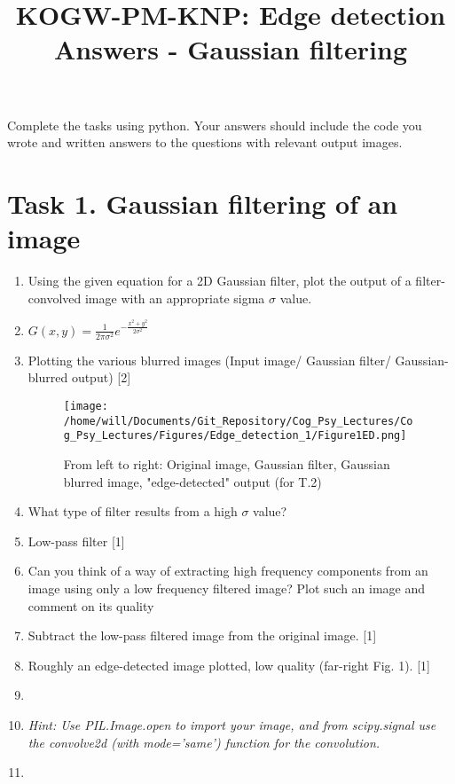\documentclass[12pt,english]{scrartcl}
\title{KOGW-PM-KNP: Edge detection Answers - Gaussian filtering}
\begin{document}
\maketitle

Complete the tasks using python. Your answers should include the code you wrote and written answers to the questions with relevant output images.

\section*{Task 1. Gaussian filtering of an image}

\begin{enumerate}
 \item Using the given equation for a 2D Gaussian filter, plot the output of a filter-convolved image with an appropriate sigma $\sigma$ value.
 \item[]
 \centering
 $G(x,y) = \frac{1}{2\pi\sigma^2} e^{-\frac{x^2+y^2}{2\sigma^2}}$
 \item[]
 \raggedright
 \color{blue}
 Plotting the various blurred images (Input image/ Gaussian filter/  Gaussian-blurred output) [2]
 \begin{figure*}[htbp]
 \centering
 \texttt{[image: /home/will/Documents/Git\_Repository/Cog\_Psy\_Lectures/Cog\_Psy\_Lectures/Figures/Edge\_detection\_1/Figure1ED.png]} 
 \caption{From left to right: Original image, Gaussian filter, Gaussian blurred image,  "edge-detected" output (for T.2)}
 \label{fig:lena_gauss}
 \end{figure*}

 
 \color{black} 
 \item What type of filter results from a high $\sigma$ value? 
 \color{blue}
 \item[]
 Low-pass filter [1]  
 
 \color{black}
 \item Can you think of a way of extracting high frequency components from an image using only a low frequency filtered image? Plot such an image and comment on its quality
 \item[]
 \color{blue}
 Subtract the low-pass filtered image from the original image. [1] \\
 \item[]
 Roughly an edge-detected image plotted, low quality (far-right Fig. 1). [1] \\
 \item[]
 \color{black}
 \item[] \textit{Hint: Use PIL.Image.open to import your image, and from scipy.signal use the convolve2d (with mode='same') function for the convolution.} \\
 \item[]

 \end{enumerate}
\end{document}
